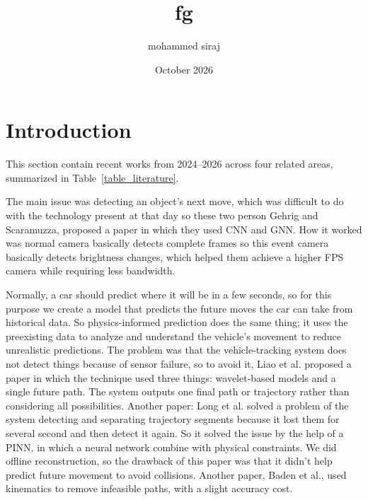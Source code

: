 \documentclass{article}
\title{fg}
\author{mohammed siraj}
\date{October 2026}
\begin{document}
\maketitle

\section{Introduction}
This section contain recent works from 2024--2026 across four related areas, summarized in Table~\ref{table_literature}.

The main issue was detecting an object's next move, which was difficult to do with the technology present at that day so these two person Gehrig and Scaramuzza, proposed a paper in which they used CNN and GNN. How it worked was normal camera basically detects complete frames so this event camera basically detects brightness changes, which helped them achieve a higher FPS camera while requiring less bandwidth. 

Normally, a car should predict where it will be in a few seconds, so for this purpose we create a model that predicts the future moves the car can take from historical data.  So physics-informed prediction does the same thing; it uses the preexisting data to analyze and understand the vehicle's movement to reduce unrealistic predictions. The problem was that the vehicle-tracking system does not detect things because of sensor failure, so to avoid it, Liao et al. proposed a paper in which the technique used three things: wavelet-based models and a single future path. The system outputs one final path or trajectory rather than considering all possibilities. Another paper: Long et al. solved a problem of the system detecting and separating trajectory segments because it lost them for several second and then detect it again. So it solved the issue by the help of a PINN, in which a neural network combine with physical constraints. We did offline reconstruction, so the drawback of this paper was that it didn't help predict future movement to avoid collisions. Another paper, Baden et al., used kinematics to remove infeasible paths, with a slight accuracy cost.
\end{document}
